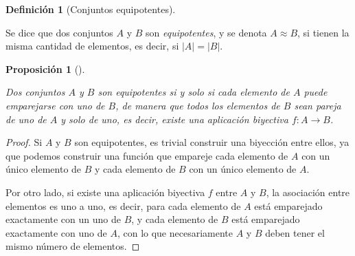 \documentclass[
  a4paper,
]{scrreport}
\theoremstyle{definition}
\theoremstyle{plain}
\theoremstyle{definition}
\newtheorem{definition}{Definición}[chapter]
\theoremstyle{definition}
\theoremstyle{plain}
\theoremstyle{plain}
\newtheorem{proposition}{Proposición}[chapter]
\theoremstyle{remark}
\begin{document}
\begin{definition}[Conjuntos
equipotentes]\protect\hypertarget{def-conjuntos-equipotentes}{}\label{def-conjuntos-equipotentes}

Se dice que dos conjuntos \(A\) y \(B\) son \emph{equipotentes}, y se
denota \(A\approx B\), si tienen la misma cantidad de elementos, es
decir, si \(|A| = |B|\).

\end{definition}

\begin{proposition}[]\protect\hypertarget{prp-biyeccion-conjuntos-equipotentes}{}\label{prp-biyeccion-conjuntos-equipotentes}

Dos conjuntos \(A\) y \(B\) son equipotentes si y solo si cada elemento
de \(A\) puede emparejarse con uno de \(B\), de manera que todos los
elementos de \(B\) sean pareja de uno de \(A\) y solo de uno, es decir,
existe una aplicación biyectiva \(f:A\rightarrow B\).

\end{proposition}

\begin{tcolorbox}[enhanced jigsaw, leftrule=.75mm, colbacktitle=quarto-callout-note-color!10!white, toprule=.15mm, opacityback=0, opacitybacktitle=0.6, toptitle=1mm, breakable, bottomtitle=1mm, colframe=quarto-callout-note-color-frame, rightrule=.15mm, titlerule=0mm, title=\textcolor{quarto-callout-note-color}{\faInfo}\hspace{0.5em}{Demostración}, arc=.35mm, left=2mm, bottomrule=.15mm, colback=white, coltitle=black]

\begin{proof}
Si \(A\) y \(B\) son equipotentes, es trivial construir una biyección
entre ellos, ya que podemos construir una función que empareje cada
elemento de \(A\) con un único elemento de \(B\) y cada elemento de
\(B\) con un único elemento de \(A\).

Por otro lado, si existe una aplicación biyectiva \(f\) entre \(A\) y
\(B\), la asociación entre elementos es uno a uno, es decir, para cada
elemento de \(A\) está emparejado exactamente con un uno de \(B\), y
cada elemento de \(B\) está emparejado exactamente con uno de \(A\), con
lo que necesariamente \(A\) y \(B\) deben tener el mismo número de
elementos.
\end{proof}

\end{tcolorbox}
\end{document}
